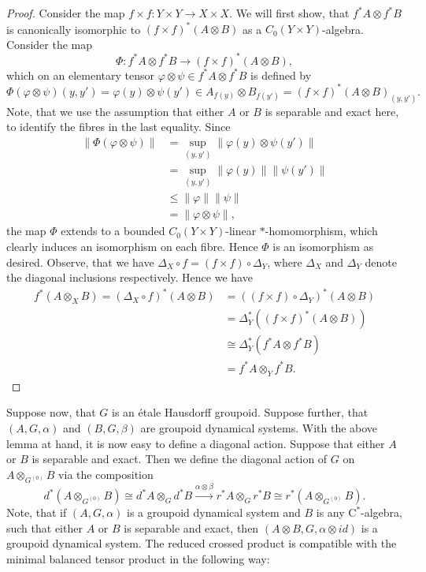 \documentclass[reqno,oneside,a4paper,11pt]{amsart}
\theoremstyle{theorem}
\theoremstyle{definition}
\newcommand{\norm}[1]{\lVert#1\rVert}   %
\begin{document}
	\begin{proof}
		Consider the map $f\times f:Y\times Y\rightarrow X\times X$. We will first show, that $f^*A\otimes f^*B$ is canonically isomorphic to $(f\times f)^*(A\otimes B)$ as a $C_0(Y\times Y)$-algebra. Consider the map
		$$\Phi:f^*A\otimes f^*B\rightarrow (f\times f)^*(A\otimes B),$$ 
		which on an elementary tensor $\varphi\otimes \psi\in f^*A\otimes f^*B$ is defined by
		$$\Phi(\varphi\otimes \psi)(y,y')=\varphi(y)\otimes\psi(y')
		\in A_{f(y)}\otimes B_{f(y')}=(f\times f)^*(A\otimes B)_{(y,y')}.$$
		Note, that we use the assumption that either $A$ or $B$ is separable and exact here, to identify the fibres in the last equality. Since
		\begin{align*}\norm{\Phi(\varphi\otimes\psi)}&=\sup\limits_{(y,y')} \norm{\varphi(y)\otimes\psi(y')}\\
		&=\sup\limits_{(y,y')}\norm{\varphi(y)}\norm{\psi(y')}\\
		&\leq\norm{\varphi}\norm{\psi}\\
		&=\norm{\varphi\otimes\psi},
		\end{align*}
		the map $\Phi$ extends to a bounded $C_0(Y\times Y)$-linear $\ast$-homomorphism, which clearly induces an isomorphism on each fibre. Hence $\Phi$ is an isomorphism as desired.
		Observe, that we have $\Delta_X\circ f=(f\times f)\circ \Delta_Y$, where $\Delta_X$ and $\Delta_Y$ denote the diagonal inclusions respectively. Hence we have
		\begin{align*}
		f^*(A\otimes_X B)=(\Delta_X\circ f)^*(A\otimes B)&=((f\times f)\circ \Delta_Y)^*(A\otimes B)\\
		&=\Delta_Y^*((f\times f)^*(A\otimes B))\\
		& \cong\Delta_Y^*(f^*A\otimes f^*B)\\
		&=f^*A\otimes_Y f^*B.
		\end{align*}
	\end{proof}
	Suppose now, that $G$ is an étale Hausdorff groupoid. Suppose further, that $(A,G,\alpha)$ and $(B,G,\beta)$ are groupoid dynamical systems. With the above lemma at hand, it is now easy to define a diagonal action. Suppose that either $A$ or $B$ is separable and exact. Then we define the diagonal action of $G$ on $A\otimes_{G^{(0)}} B$ via the composition
	$$d^*(A\otimes_{G^{(0)}} B)\cong d^*A\otimes_G d^*B\stackrel{\alpha\otimes \beta}{\longrightarrow}r^*A\otimes_G r^*B\cong r^*(A\otimes_{G^{(0)}} B).$$
	Note, that if $(A,G,\alpha)$ is a groupoid dynamical system and $B$ is any $\mathrm{C}^*$-algebra, such that either $A$ or $B$ is separable and exact, then $(A\otimes B,G,\alpha\otimes id)$ is a groupoid dynamical system. The reduced crossed product is compatible with the minimal balanced tensor product in the following way:
\end{document}
